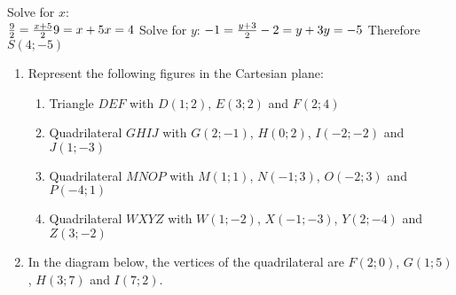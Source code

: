 \begin{exercises}{}
{\begin{enumerate}[itemsep=5pt, label=\textbf{\arabic*}. ]
\begin{solutions}{}
{\begin{enumerate}[itemsep=5pt, label=\textbf{\arabic*}. ]
Solve for $x$: \\
  $\frac{9}{2} = \frac{x+5}{2} \\ 
  9 = x+5 \\ 
  x = 4 \\ $
Solve for $y$:
  $-1 = \frac{y+3}{2} \\ 
  -2 = y+3 \\ 
  y = -5 \\ $
Therefore $S(4;-5)$ \\
\end{enumerate}}
\end{solutions}
\begin{eocexercises}{}
  \begin{enumerate}[noitemsep, label=\textbf{\arabic*}. ] 
  \item Represent the following figures in the Cartesian plane: 
    \begin{enumerate}[noitemsep, label=\textbf{(\alph*)} ]
    \item Triangle $DEF$ with $D(1;2)$, $E(3;2)$ and $F(2;4)$ 
    \item Quadrilateral $GHIJ$ with $G(2;-1)$, $H(0;2)$, $I(-2;-2)$ and $J(1;-3)$
    \item Quadrilateral $MNOP$ with $M(1;1)$, $N(-1;3)$, $O(-2;3)$ and $P(-4;1)$ 
    \item Quadrilateral $WXYZ$ with $W(1;-2)$, $X(-1;-3)$, $Y(2;-4)$ and $Z(3;-2)$
    \end{enumerate}
  \item In the diagram below, the vertices of the quadrilateral are $F(2;0)$, $G(1;5)$, $H(3;7)$ and $I(7;2)$.
    \setcounter{subfigure}{0}
    \begin{figure}[H] %
      \begin{center}
      \end{center}

\end{figure}
\end{enumerate}
\end{eocexercises}
\end{enumerate}}
\end{exercises}

